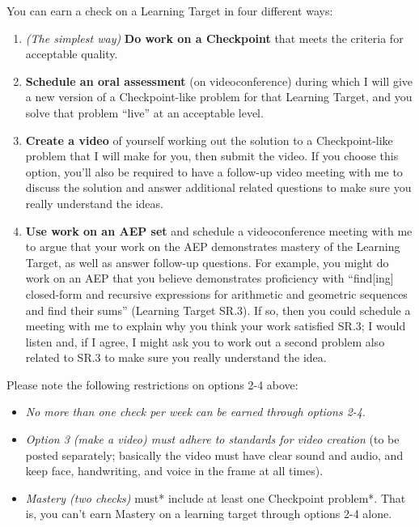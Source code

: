 \documentclass[]{article}
\providecommand{\tightlist}{%
  \setlength{\itemsep}{0pt}\setlength{\parskip}{0pt}}
\begin{document}
You can earn a check on a Learning Target in four different ways:

\begin{enumerate}
\def\labelenumi{\arabic{enumi}.}
\tightlist
\item
  \emph{(The simplest way)} \textbf{Do work on a Checkpoint} that meets
  the criteria for acceptable quality.
\item
  \textbf{Schedule an oral assessment} (on videoconference) during which
  I will give a new version of a Checkpoint-like problem for that
  Learning Target, and you solve that problem ``live'' at an acceptable
  level.
\item
  \textbf{Create a video} of yourself working out the solution to a
  Checkpoint-like problem that I will make for you, then submit the
  video. If you choose this option, you'll also be required to have a
  follow-up video meeting with me to discuss the solution and answer
  additional related questions to make sure you really understand the
  ideas.
\item
  \textbf{Use work on an AEP set} and schedule a videoconference meeting
  with me to argue that your work on the AEP demonstrates mastery of the
  Learning Target, as well as answer follow-up questions. For example,
  you might do work on an AEP that you believe demonstrates proficiency
  with ``find{[}ing{]} closed-form and recursive expressions for
  arithmetic and geometric sequences and find their sums'' (Learning
  Target SR.3). If so, then you could schedule a meeting with me to
  explain why you think your work satisfied SR.3; I would listen and, if
  I agree, I might ask you to work out a second problem also related to
  SR.3 to make sure you really understand the idea.
\end{enumerate}

Please note the following restrictions on options 2-4 above:

\begin{itemize}
\tightlist
\item
  \emph{No more than one check per week can be earned through options
  2-4}.
\item
  \emph{Option 3 (make a video) must adhere to standards for video
  creation} (to be posted separately; basically the video must have
  clear sound and audio, and keep face, handwriting, and voice in the
  frame at all times).
\item
  \emph{Mastery (two checks) }must* include at least one Checkpoint
  problem*. That is, you can't earn Mastery on a learning target through
  options 2-4 alone.
\end{itemize}
\end{document}
